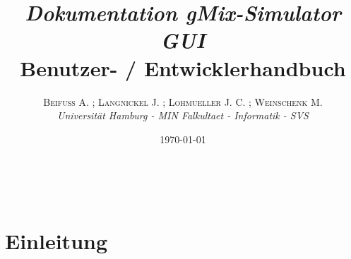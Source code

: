 \documentclass[a4paper, 11pt]{article} %
\title{\emph{Dokumentation gMix-Simulator GUI}\\ %
Benutzer- / Entwicklerhandbuch} %
\author{\textsc{Beifuß A. ; Langnickel J. ; Lohmueller J. C. ; Weinschenk M.} %
\\{\textit{Universität Hamburg - MIN Falkultaet - Informatik - SVS}}} %
\date{\today} %
\makeatletter
\renewcommand{\maketitle}{ %
\begin{flushright} %
{\LARGE\@title} %

\vspace{50pt} %

{\large\@author} %
\\\@date %

\vspace{40pt} %
\end{flushright}
}
\makeatother
\begin{document}
\maketitle %

 


\tableofcontents


\vspace{30pt} %

\section{Einleitung} %
\label{sec:einleitung}
\end{document}
